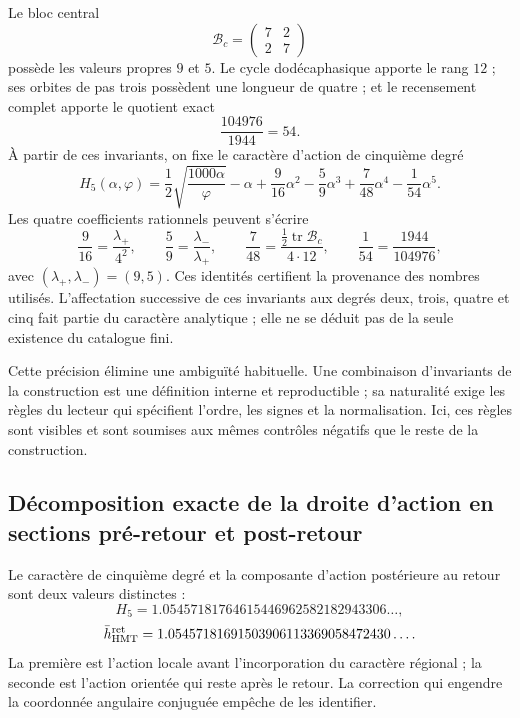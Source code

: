 
Le bloc central
\[
\mathcal B_c=\begin{pmatrix}7&2\\2&7\end{pmatrix}
\]
possède les valeurs propres \(9\) et \(5\). Le cycle dodécaphasique apporte le rang
\(12\) ; ses orbites de pas trois possèdent une longueur de quatre ; et le recensement complet
apporte le quotient exact
\[
\frac{104976}{1944}=54.
\]
À partir de ces invariants, on fixe le caractère d'action de cinquième degré
\[
\boxed{
H_5(\alpha,\varphi)
=\frac12\sqrt{\frac{1000\alpha}{\varphi}}-\alpha
+\frac9{16}\alpha^2-\frac59\alpha^3
+\frac7{48}\alpha^4-\frac1{54}\alpha^5.}
\]
Les quatre coefficients rationnels peuvent s'écrire
\[
\frac9{16}=\frac{\lambda_+}{4^2},
\qquad
\frac59=\frac{\lambda_-}{\lambda_+},
\qquad
\frac7{48}=\frac{\tfrac12\operatorname{tr}\mathcal B_c}{4\cdot12},
\qquad
\frac1{54}=\frac{1944}{104976},
\]
avec \((\lambda_+,\lambda_-)=(9,5)\). Ces identités certifient la
provenance des nombres utilisés. L'affectation successive de ces
invariants aux degrés deux, trois, quatre et cinq fait partie du caractère
analytique ; elle ne se déduit pas de la seule existence du catalogue fini.

Cette précision élimine une ambiguïté habituelle. Une combinaison
d'invariants de la construction est une définition interne et reproductible ; sa
naturalité exige les règles du lecteur qui spécifient l'ordre, les signes et la
normalisation. Ici, ces règles sont visibles et sont soumises aux mêmes
contrôles négatifs que le reste de la construction.

\subsection{Décomposition exacte de la droite d'action en sections pré-retour et post-retour}
\label{sec:s102:c38:3:3}


Le caractère de cinquième degré et la composante d'action postérieure au retour
sont deux valeurs distinctes :
\[
H_5
=1.05457181764615446962582182943306\ldots,
\]
\[
\bar h_{\rm HMT}^{\rm ret}
=1.05457181691503906113369058472430\ldots.
\]
La première est l'action locale avant l'incorporation du caractère régional ; la
seconde est l'action orientée qui reste après le retour. La correction
qui engendre la coordonnée angulaire conjuguée empêche de les identifier.

